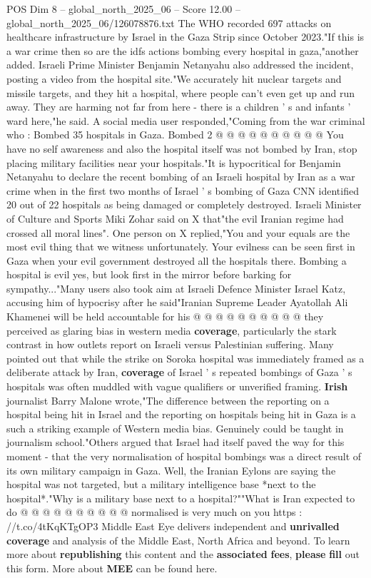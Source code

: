 \begin{textsample}{POS Dim 8 – global\_north\_2025\_06 – Score 12.00 – global\_north\_2025\_06/126078876.txt}
The WHO recorded 697 attacks on healthcare infrastructure by Israel in the Gaza Strip since October 2023."If this is a war crime then so are the idfs actions bombing every hospital in gaza,"another added.
Israeli Prime Minister Benjamin Netanyahu also addressed the incident, posting a video from the hospital site."We accurately hit nuclear targets and missile targets, and they hit a hospital, where people can't even get up and run away.
They are harming not far from here - there is a children ' s and infants ' ward here,"he said.
A social media user responded,"Coming from the war criminal who : Bombed 35 hospitals in Gaza.
Bombed 2 @ @ @ @ @ @ @ @ @ @ You have no self awareness and also the hospital itself was not bombed by Iran, stop placing military facilities near your hospitals."It is hypocritical for Benjamin Netanyahu to declare the recent bombing of an Israeli hospital by Iran as a war crime when in the first two months of Israel ' s bombing of Gaza CNN identified 20 out of 22 hospitals as being damaged or completely destroyed.
Israeli Minister of Culture and Sports Miki Zohar said on X that"the evil Iranian regime had crossed all moral lines".
One person on X replied,"You and your equals are the most evil thing that we witness unfortunately.
Your evilness can be seen first in Gaza when your evil government destroyed all the hospitals there.
Bombing a hospital is evil yes, but look first in the mirror before barking for sympathy..."Many users also took aim at Israeli Defence Minister Israel Katz, accusing him of hypocrisy after he said"Iranian Supreme Leader Ayatollah Ali Khamenei will be held accountable for his @ @ @ @ @ @ @ @ @ @ they perceived as glaring bias in western media \textbf{coverage}, particularly the stark contrast in how outlets report on Israeli versus Palestinian suffering.
Many pointed out that while the strike on Soroka hospital was immediately framed as a deliberate attack by Iran, \textbf{coverage} of Israel ' s repeated bombings of Gaza ' s hospitals was often muddled with vague qualifiers or unverified framing. \textbf{Irish} journalist Barry Malone wrote,"The difference between the reporting on a hospital being hit in Israel and the reporting on hospitals being hit in Gaza is a such a striking example of Western media bias.
Genuinely could be taught in journalism school."Others argued that Israel had itself paved the way for this moment - that the very normalisation of hospital bombings was a direct result of its own military campaign in Gaza.
Well, the Iranian Eylons are saying the hospital was not targeted, but a military intelligence base *next to the hospital*."Why is a military base next to a hospital?""What is Iran expected to do @ @ @ @ @ @ @ @ @ @ normalised is very much on you https : //t.co/4tKqKTgOP3 Middle East Eye delivers independent and \textbf{unrivalled} \textbf{coverage} and analysis of the Middle East, North Africa and beyond.
To learn more about \textbf{republishing} this content and the \textbf{associated} \textbf{fees}, \textbf{please} \textbf{fill} out this form.
More about \textbf{MEE} can be found here.

\end{textsample}
